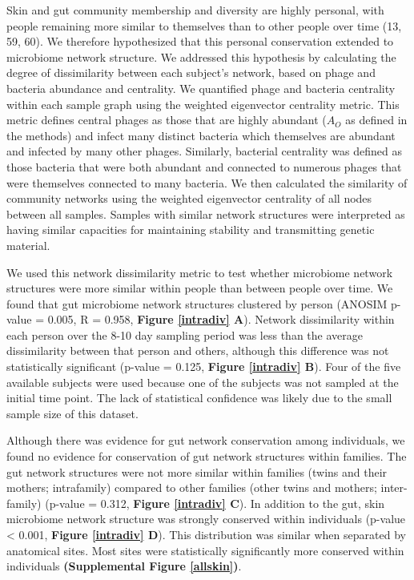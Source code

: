 \documentclass[12pt,]{article}
\begin{document}
Skin and gut community membership and diversity are highly personal,
with people remaining more similar to themselves than to other people
over time (13, 59, 60). We therefore hypothesized that this personal
conservation extended to microbiome network structure. We addressed this
hypothesis by calculating the degree of dissimilarity between each
subject's network, based on phage and bacteria abundance and centrality.
We quantified phage and bacteria centrality within each sample graph
using the weighted eigenvector centrality metric. This metric defines
central phages as those that are highly abundant (\(A_{O}\) as defined
in the methods) and infect many distinct bacteria which themselves are
abundant and infected by many other phages. Similarly, bacterial
centrality was defined as those bacteria that were both abundant and
connected to numerous phages that were themselves connected to many
bacteria. We then calculated the similarity of community networks using
the weighted eigenvector centrality of all nodes between all samples.
Samples with similar network structures were interpreted as having
similar capacities for maintaining stability and transmitting genetic
material.

We used this network dissimilarity metric to test whether microbiome
network structures were more similar within people than between people
over time. We found that gut microbiome network structures clustered by
person (ANOSIM p-value = 0.005, R = 0.958, \textbf{Figure \ref{intradiv}
A}). Network dissimilarity within each person over the 8-10 day sampling
period was less than the average dissimilarity between that person and
others, although this difference was not statistically significant
(p-value = 0.125, \textbf{Figure \ref{intradiv} B}). Four of the five
available subjects were used because one of the subjects was not sampled
at the initial time point. The lack of statistical confidence was likely
due to the small sample size of this dataset.

Although there was evidence for gut network conservation among
individuals, we found no evidence for conservation of gut network
structures within families. The gut network structures were not more
similar within families (twins and their mothers; intrafamily) compared
to other families (other twins and mothers; inter-family) (p-value =
0.312, \textbf{Figure \ref{intradiv} C}). In addition to the gut, skin
microbiome network structure was strongly conserved within individuals
(p-value \textless{} 0.001, \textbf{Figure \ref{intradiv} D}). This
distribution was similar when separated by anatomical sites. Most sites
were statistically significantly more conserved within individuals
\textbf{(Supplemental Figure \ref{allskin})}.
\end{document}
